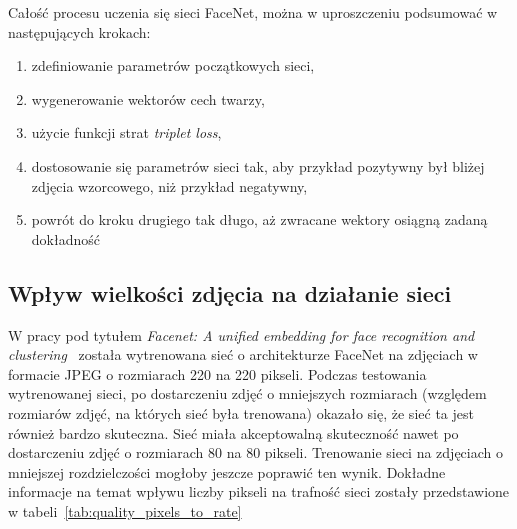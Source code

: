 Całość procesu uczenia się sieci FaceNet, można w uproszczeniu podsumować w następujących krokach:

\begin{enumerate}
    \item zdefiniowanie parametrów początkowych sieci,
    \item wygenerowanie wektorów cech twarzy,
    \item użycie funkcji strat \textit{triplet loss},
    \item dostosowanie się parametrów sieci tak, aby przykład pozytywny był bliżej zdjęcia wzorcowego, niż przykład negatywny,
    \item powrót do kroku drugiego tak długo, aż zwracane wektory osiągną zadaną dokładność
\end{enumerate}

\subsection{Wpływ wielkości zdjęcia na działanie sieci}

W pracy pod tytułem \textit{Facenet: A unified embedding for face recognition and clustering}~\cite{schroff2015facenet}
została wytrenowana sieć o architekturze FaceNet na zdjęciach w formacie JPEG o rozmiarach 220 na 220 pikseli.
Podczas testowania wytrenowanej sieci, po dostarczeniu zdjęć o mniejszych rozmiarach (względem rozmiarów
zdjęć, na których sieć była trenowana) okazało się, że sieć ta jest również bardzo skuteczna.
Sieć miała akceptowalną skuteczność nawet po dostarczeniu zdjęć o rozmiarach 80 na 80 pikseli.
Trenowanie sieci na zdjęciach o mniejszej rozdzielczości mogłoby jeszcze poprawić ten wynik.
Dokładne informacje na temat wpływu liczby pikseli na
trafność sieci zostały przedstawione w tabeli~\ref{tab:quality_pixels_to_rate}

